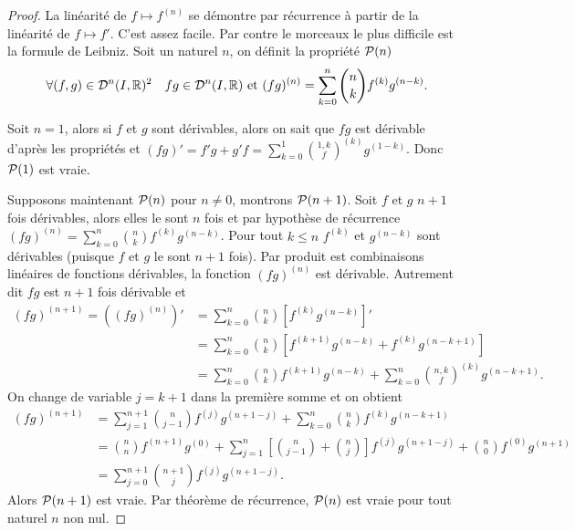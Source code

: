 \begin{proof}
  La linéarité de \(f \longmapsto f^{(n)}\) se démontre par récurrence à partir
  de la linéarité de \(f \longmapsto f'\). C'est assez facile. Par contre le
  morceaux le plus difficile est la formule de Leibniz. Soit un naturel \(n\),
  on définit la propriété \(\P(n)\)
  \begin{equation}
    \forall (f,g) \in \derivnfois{n}{I}{\R}^2 \quad fg \in \derivnfois{n}{I}{\R}
    \text{~et~} (fg)^{(n)}=\sum_{k=0}^n \binom{n}{k} f^{(k)}g^{(n-k)}.
  \end{equation}

  Soit \(n=1\), alors si \(f\) et \(g\) sont dérivables, alors on sait que
  \(fg\) est dérivable d'après les propriétés et \((fg)'=f'g+g'f=\sum_{k=0}^1
  \binom{1,k} f^{(k)}g^{(1-k)}\). Donc \(\P(1)\) est vraie.

  Supposons maintenant \(\P(n)\) pour \(n \neq 0\), montrons \(\P(n+1)\). Soit
  \(f\) et \(g\) \(n+1\) fois dérivables, alors elles le sont \(n\) fois et par
  hypothèse de récurrence \((fg)^{(n)}=\sum_{k=0}^n \binom{n}{k}
  f^{(k)}g^{(n-k)}\). Pour tout \(k \leqslant n\) \(f^{(k)}\) et \(g^{(n-k)}\)
  sont dérivables (puisque \(f\) et \(g\) le sont \(n+1\) fois). Par produit est
  combinaisons linéaires de fonctions dérivables, la fonction \((fg)^{(n)}\) est
  dérivable. Autrement dit \(fg\) est \(n+1\) fois dérivable et
  \begin{align}
    (fg)^{(n+1)}=\left((fg)^{(n)}\right)'&=\sum_{k=0}^n \binom{n}{k}
    [f^{(k)}g^{(n-k)}]' \\
    &=\sum_{k=0}^n \binom{n}{k} [f^{(k+1)}g^{(n-k)}+f^{(k)}g^{(n-k+1)}]\\
    &=\sum_{k=0}^n \binom{n}{k} f^{(k+1)}g^{(n-k)} + \sum_{k=0}^n \binom{n,k}
    f^{(k)}g^{(n-k+1)}.
  \end{align}
  On change de variable \(j=k+1\) dans la première somme et on obtient
  \begin{align}
    (fg)^{(n+1)}&=\sum_{j=1}^{n+1} \binom{n}{j-1} f^{(j)}g^{(n+1-j)} +
    \sum_{k=0}^n \binom{n}{k} f^{(k)}g^{(n-k+1)}\\
    &= \binom{n}{n} f^{(n+1)}g^{(0)} + \sum_{j=1}^n
    \left[\binom{n}{j-1}+\binom{n}{j}\right]f^{(j)}g^{(n+1-j)} + \binom{n}{0}
    f^{(0)}g^{(n+1)}\\
    &= \sum_{j=0}^{n+1} \binom{n+1}{j}f^{(j)}g^{(n+1-j)}.
  \end{align}
  Alors \(\P(n+1)\) est vraie. Par théorème de récurrence, \(\P(n)\) est vraie
  pour tout naturel \(n\) non nul.
\end{proof}

